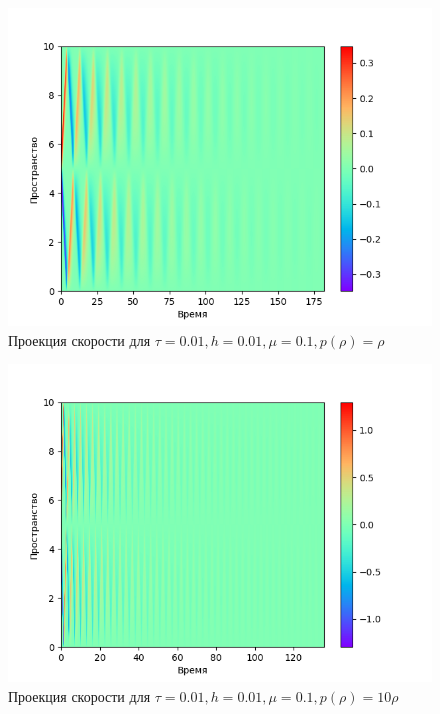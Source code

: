 \begin{center}
\begin{figure}[H]
    \centering
    \includegraphics[height=0.4\textheight]{pics/task2/u-2-2-11_1.png}
    \caption{Проекция скорости для $\tau = 0.01, h = 0.01, \mu = 0.1, p(\rho) = \rho$}
\end{figure}

\begin{figure}[H]
    \centering
    \includegraphics[height=0.4\textheight]{pics/task2/u-2-2-12_1.png}
    \caption{Проекция скорости для $\tau = 0.01, h = 0.01, \mu = 0.1, p(\rho) = 10\rho$}
\end{figure}


\end{center}
